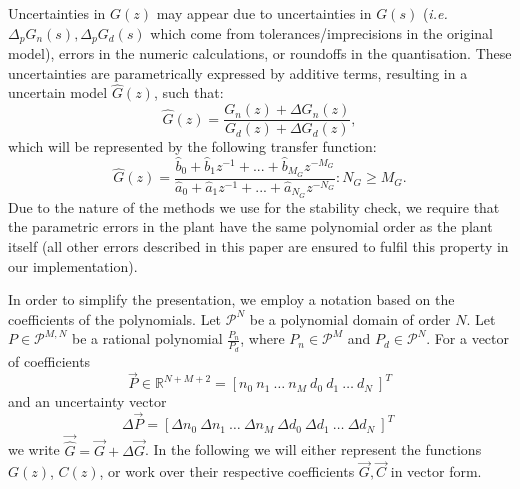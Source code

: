 \documentclass{sig-alternate-05-2015}
\begin{document}
Uncertainties in $G(z)$ may appear due to uncertainties in $G(s)$
(\emph{i.e.} $\Delta_p{G}_n(s),\Delta_p{G}_d(s)$ which come from tolerances/imprecisions in the original model), errors in the numeric
calculations, or roundoffs in the quantisation.  These uncertainties are 
parametrically expressed by additive terms, resulting in a uncertain model
$\hat{G}(z)$, such that:
%
\begin{equation}
\hat{G}(z)=\frac{G_n(z)+\Delta G_n(z)}{G_d(z)+\Delta G_d(z)},
\end{equation}
%
which will be represented by the following transfer function:
%
\begin{equation}
\hat{G}(z)=\frac{\hat{b}_{0}+\hat{b}_{1}z^{-1}+...+\hat{b}_{M_G}z^{-M_G}}{\hat{a}_{0}+\hat{a}_{1}z^{-1}+...+\hat{a}_{N_G}z^{-N_G}} : N_G \geq M_G .
\end{equation}
%
Due to the nature of the methods we use for the stability check, we require
that the parametric errors in the plant have the same polynomial order as
the plant itself (all other errors described in this paper are ensured to fulfil this property in our
implementation).

In order to simplify the presentation, we employ a notation based on the
coefficients of the polynomials.  Let $\mathcal{P}^{N}$ be a polynomial
domain of order $N$. Let $P \in \mathcal{P}^{M,N}$ be a rational polynomial
$\frac{P_n}{P_d}$, where $P_n \in \mathcal{P}^{M}$ and $P_d \in \mathcal{P}^{N}$.  
For a vector of coefficients
%
\begin{equation}
\vec{P} \in \mathbb{R}^{N+M+2}=[n_{0}\ n_{1}\ \hdots \ n_{M}\ d_{0}\ d_{1}\ \hdots\ d_{N}\ ]^T
\label{eq:coefficients}
\end{equation}
%
and an uncertainty vector 
%
\begin{equation}
\Delta{\vec{P}}=[\Delta{n}_{0}\ \Delta{n}_{1}\ \hdots \ \Delta{n}_{M}\ \Delta{d}_{0}\ \Delta{d}_{1}\ \hdots\ \Delta{d}_{N}\ ]^T \; 
\label{eq:delta_coefficients}
\end{equation}
%
we write $\vec{\hat{G}}=\vec{G}+\Delta{\vec{G}}$.   
In the following we will either represent the functions $G(z)$, $C(z)$, 
or work over their respective coefficients $\vec{G}, \vec{C}$ in vector form.   
\end{document}
